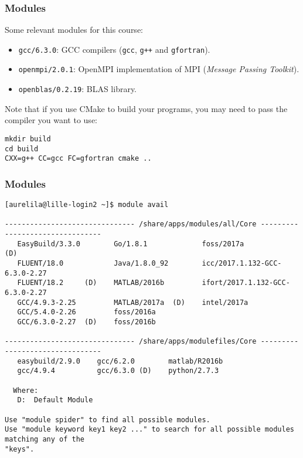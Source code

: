 \begin{frame}[fragile]
  \frametitle{Modules}
Some relevant modules for this course:
\begin{itemize}
  \item \texttt{gcc/6.3.0}: GCC compilers (\texttt{gcc}, \texttt{g++} and
    \texttt{gfortran}).
  \item \texttt{openmpi/2.0.1}: OpenMPI implementation of MPI (\emph{Message Passing Toolkit}).
  \item \texttt{openblas/0.2.19}: BLAS library.
\end{itemize}

\medskip
Note that if you use CMake to build your programs, you may need to pass the compiler you want to use:
\begin{lstlisting}[style=shell]
mkdir build
cd build
CXX=g++ CC=gcc FC=gfortran cmake ..
\end{lstlisting}
\end{frame}

\begin{frame}[fragile]
  \frametitle{Modules}

\tiny{
\begin{lstlisting}[style=shell]
[aurelila@lille-login2 ~]$ module avail

------------------------------- /share/apps/modules/all/Core --------------------------------
   EasyBuild/3.3.0        Go/1.8.1             foss/2017a                      (D)
   FLUENT/18.0            Java/1.8.0_92        icc/2017.1.132-GCC-6.3.0-2.27
   FLUENT/18.2     (D)    MATLAB/2016b         ifort/2017.1.132-GCC-6.3.0-2.27
   GCC/4.9.3-2.25         MATLAB/2017a  (D)    intel/2017a
   GCC/5.4.0-2.26         foss/2016a
   GCC/6.3.0-2.27  (D)    foss/2016b

------------------------------- /share/apps/modulefiles/Core --------------------------------
   easybuild/2.9.0    gcc/6.2.0        matlab/R2016b
   gcc/4.9.4          gcc/6.3.0 (D)    python/2.7.3

  Where:
   D:  Default Module

Use "module spider" to find all possible modules.
Use "module keyword key1 key2 ..." to search for all possible modules matching any of the
"keys".
\end{lstlisting}
}

\end{frame}

